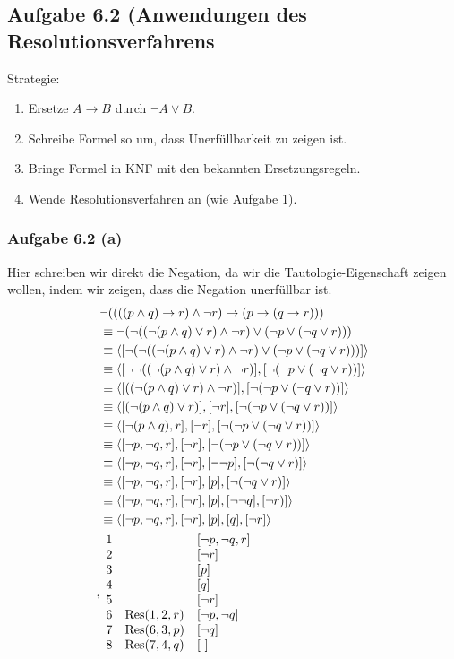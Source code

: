 \subsection{Aufgabe 6.2 (Anwendungen des Resolutionsverfahrens}
Strategie:
\begin{enumerate}
	\item Ersetze $A\to B$ durch $\neg A\vee B$.
	\item Schreibe Formel so um, dass Unerfüllbarkeit zu zeigen ist.
	\item Bringe Formel in KNF mit den bekannten Ersetzungsregeln.
	\item Wende Resolutionsverfahren an (wie Aufgabe 1).
\end{enumerate}

\subsubsection{Aufgabe 6.2 (a)}
Hier schreiben wir direkt die Negation, da wir die Tautologie-Eigenschaft zeigen wollen, indem wir zeigen, dass die Negation unerfüllbar ist.
\begin{align*}
	&\neg((((p\wedge q)\to r)\wedge\neg r)\to(p\to(q\to r)))\\
	&\equiv
	\neg(\neg((\neg(p\wedge q)\vee r)\wedge\neg r)\vee(\neg p\vee(\neg q\vee r)))\\
	&\equiv
	\langle[\neg(\neg((\neg(p\wedge q)\vee r)\wedge\neg r)\vee(\neg p\vee(\neg q\vee r)))]\rangle\\
	&\equiv
	\langle[\neg\neg((\neg(p\wedge q)\vee r)\wedge\neg r)],[\neg(\neg p\vee(\neg q\vee r))]\rangle\\
	&\equiv
	\langle[((\neg(p\wedge q)\vee r)\wedge\neg r)],[\neg(\neg p\vee(\neg q\vee r))]\rangle\\
	&\equiv
	\langle[(\neg(p\wedge q)\vee r)],[\neg r],[\neg(\neg p\vee(\neg q\vee r))]\rangle\\
	&\equiv
	\langle[\neg(p\wedge q), r],[\neg r],[\neg(\neg p\vee(\neg q\vee r))]\rangle\\
	&\equiv
	\langle[\neg p,\neg q, r],[\neg r],[\neg(\neg p\vee(\neg q\vee r))]\rangle\\
	&\equiv
	\langle[\neg p,\neg q, r],[\neg r],[\neg\neg p],[\neg(\neg q\vee r)]\rangle\\
	&\equiv
	\langle[\neg p,\neg q, r],[\neg r],[p],[\neg(\neg q\vee r)]\rangle\\
	&\equiv
	\langle[\neg p,\neg q, r],[\neg r],[p],[\neg\neg q],[\neg r)]\rangle\\
	&\equiv
	\langle[\neg p,\neg q, r],[\neg r],[p],[q],[\neg r]\rangle\\,
	&\begin{array}{rll}
		1 &&[\neg p,\neg q,r]\\
		2 &&[\neg r]\\
		3 &&[p]\\
		4 &&[q]\\
		5 &&[\neg r]\\
		6 & \operatorname{Res}(1,2,r) & [\neg p,\neg q]\\
		7 & \operatorname{Res}(6,3,p) & [\neg q]\\
		8 & \operatorname{Res}(7,4,q) & [~]
	\end{array}
\end{align*}
